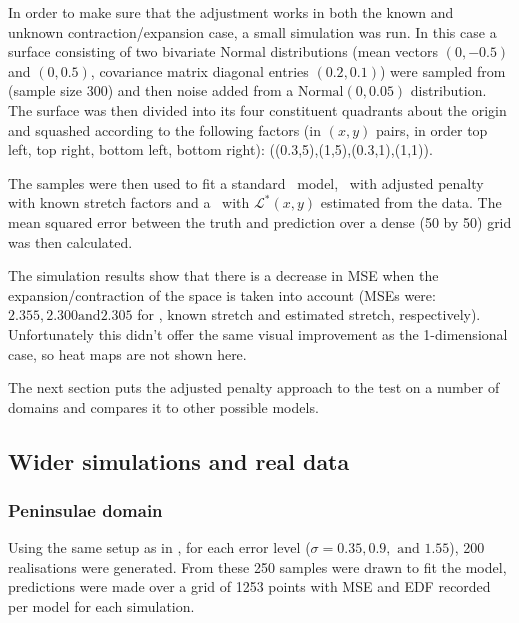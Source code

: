 {In order to make sure that the adjustment works in both the known and unknown contraction/expansion case, a small simulation was run. In this case a surface consisting of two bivariate Normal distributions (mean vectors $(0,-0.5)$ and $(0,0.5)$, covariance matrix diagonal entries $(0.2,0.1)$) were sampled from (sample size 300) and then noise added from a $\text{Normal}(0,0.05)$ distribution. The surface was then divided into its four constituent quadrants about the origin and squashed according to the following factors (in $(x,y)$ pairs, in order top left, top right, bottom left, bottom right): ((0.3,5),(1,5),(0.3,1),(1,1)).

The samples were then used to fit a standard \tprs\ model, \tprs\ with adjusted penalty with known stretch factors and a \tprs\ with $\mathcal{L}^*(x,y)$ estimated from the data. The mean squared error between the truth and prediction over a dense (50 by 50) grid was then calculated.

The simulation results show that there is a decrease in MSE when the expansion/contraction of the space is taken into account (MSEs were: $2.355, 2.300 \text{and} 2.305$ for \tprs, known stretch and estimated stretch, respectively). Unfortunately this didn't offer the same visual improvement as the 1-dimensional case, so heat maps are not shown here.

The next section puts the adjusted penalty approach to the test on a number of domains and compares it to other possible models.

\subsection{Wider simulations and real data}

\subsubsection{Peninsulae domain}
\label{wt2bigsim}

Using the same setup as in , for each error level ($\sigma=0.35, 0.9, \text{ and } 1.55$), 200 realisations were generated. From these 250 samples were drawn to fit the model, predictions were made over a grid of 1253 points with MSE and EDF recorded per model for each simulation. 

}
